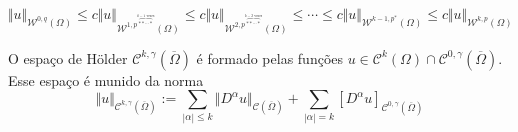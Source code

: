 \documentclass[a4paper, 11pt]{book}
\theoremstyle{definition}
\newcommand{\cC}{\mathcal{C}}
\newcommand{\cW}{\mathcal{W}}
\begin{document}
\[
    \Vert u \Vert_{\cW^{0,q}(\Omega)} \leqslant c \Vert u \Vert_{\cW^{1,p^{\overbrace{** \cdots *}^{k-1 \text{ vezes}}}}(\Omega)} \leqslant c \Vert u \Vert_{\cW^{2,p^{\overbrace{** \cdots *}^{k-2 \text{ vezes}}}}(\Omega)} \leqslant \cdots \leqslant c \Vert u \Vert_{\cW^{k-1, p^*}(\Omega)} \leqslant c \Vert u \Vert_{\cW^{k,p}(\Omega)}
\]

\begin{dbox}
    O espaço de Hölder $\cC^{k,\gamma}(\overline\Omega)$ é formado pelas funções $u \in \cC^k(\Omega) \cap \cC^{0,\gamma}(\overline\Omega)$. Esse espaço é munido da norma
    \[
        \Vert u \Vert_{\cC^{k,\gamma}(\overline\Omega)} := \sum_{|\alpha| \leqslant k} \Vert D^{\alpha}u \Vert_{\cC(\overline\Omega)} + \sum_{|\alpha| = k} [D^\alpha u]_{\cC^{0,\gamma}(\overline\Omega)}
    \] 
\end{dbox}
\end{document}
